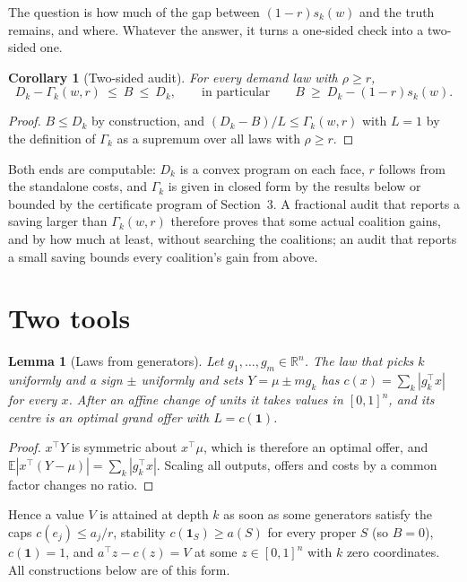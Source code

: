 \documentclass[11pt,a4paper]{article}
\newtheorem{lemma}[theorem]{Lemma}
\newtheorem{corollary}[theorem]{Corollary}
\theoremstyle{remark}
\newcommand{\one}{\mathbf 1}
\newcommand{\E}{\mathbb E}
\begin{document}
The question is how much of the gap between $(1-r)s_k(w)$ and the truth
remains, and where. Whatever the answer, it turns a one-sided check into a
two-sided one.

\begin{corollary}[Two-sided audit]\label{cor:twosided}
For every demand law with $\rho\ge r$,
\[
D_k-\Gamma_k(w,r)\ \le\ B\ \le\ D_k ,
\qquad\text{in particular}\qquad
B\ \ge\ D_k-(1-r)s_k(w).
\]
\end{corollary}

\begin{proof}
$B\le D_k$ by construction, and $(D_k-B)/L\le\Gamma_k(w,r)$ with $L=1$ by the
definition of $\Gamma_k$ as a supremum over all laws with $\rho\ge r$.
\end{proof}

Both ends are computable: $D_k$ is a convex program on each face, $r$ follows
from the standalone costs, and $\Gamma_k$ is given in closed form by the
results below or bounded by the certificate program of Section~3. A
fractional audit that reports a saving larger than $\Gamma_k(w,r)$ therefore
proves that some actual coalition gains, and by how much at least, without
searching the coalitions; an audit that reports a small saving bounds every
coalition's gain from above.

\section{Two tools}

\begin{lemma}[Laws from generators]\label{lem:generators}
Let $g_1,\dots,g_m\in\mathbb R^n$. The law that picks $k$ uniformly and a sign
$\pm$ uniformly and sets $Y=\mu\pm m g_k$ has $c(x)=\sum_k|g_k^\top x|$ for
every $x$. After an affine change of units it takes values in $[0,1]^n$, and
its centre is an optimal grand offer with $L=c(\one)$.
\end{lemma}

\begin{proof}
$x^\top Y$ is symmetric about $x^\top\mu$, which is therefore an optimal offer,
and $\E|x^\top(Y-\mu)|=\sum_k|g_k^\top x|$. Scaling all outputs, offers and
costs by a common factor changes no ratio.
\end{proof}

Hence a value $V$ is attained at depth $k$ as soon as some generators satisfy
the caps $c(e_j)\le a_j/r$, stability $c(\one_S)\ge a(S)$ for every proper $S$
(so $B=0$), $c(\one)=1$, and $a^\top z-c(z)=V$ at some $z\in[0,1]^n$ with $k$
zero coordinates. All constructions below are of this form.
\end{document}
